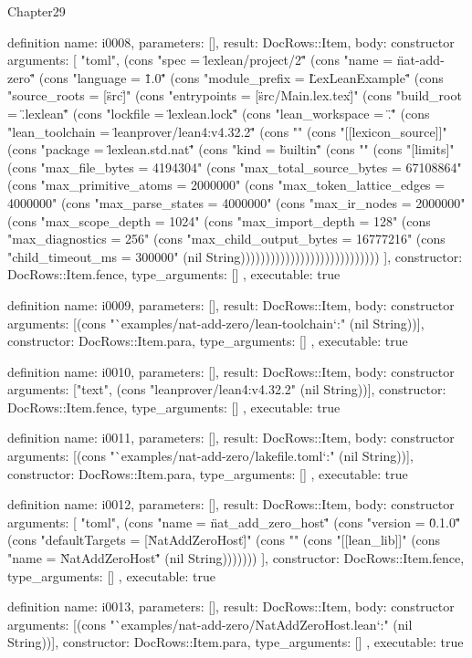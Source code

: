 \begin{lexlean}{Chapter29}
\begin{semanticmodule}
definition{
  name: i0008,
  parameters: [],
  result: DocRows::Item,
  body: constructor{
    arguments: [
      "toml",
      (cons "spec = \"lexlean/project/2\"" (cons "name = \"nat-add-zero\"" (cons "language = \"1.0\"" (cons "module_prefix = \"LexLeanExample\"" (cons "source_roots = [\"src\"]" (cons "entrypoints = [\"src/Main.lex.tex\"]" (cons "build_root = \".lexlean\"" (cons "lockfile = \"lexlean.lock\"" (cons "lean_workspace = \".\"" (cons "lean_toolchain = \"leanprover/lean4:v4.32.2\"" (cons "" (cons "[[lexicon_source]]" (cons "package = \"lexlean.std.nat\"" (cons "kind = \"builtin\"" (cons "" (cons "[limits]" (cons "max_file_bytes = 4194304" (cons "max_total_source_bytes = 67108864" (cons "max_primitive_atoms = 2000000" (cons "max_token_lattice_edges = 4000000" (cons "max_parse_states = 4000000" (cons "max_ir_nodes = 2000000" (cons "max_scope_depth = 1024" (cons "max_import_depth = 128" (cons "max_diagnostics = 256" (cons "max_child_output_bytes = 16777216" (cons "child_timeout_ms = 300000" (nil String))))))))))))))))))))))))))))
    ],
    constructor: DocRows::Item.fence,
    type_arguments: []
  },
  executable: true
}

definition{
  name: i0009,
  parameters: [],
  result: DocRows::Item,
  body: constructor{
    arguments: [(cons "`examples/nat-add-zero/lean-toolchain`:" (nil String))],
    constructor: DocRows::Item.para,
    type_arguments: []
  },
  executable: true
}

definition{
  name: i0010,
  parameters: [],
  result: DocRows::Item,
  body: constructor{
    arguments: ["text", (cons "leanprover/lean4:v4.32.2" (nil String))],
    constructor: DocRows::Item.fence,
    type_arguments: []
  },
  executable: true
}

definition{
  name: i0011,
  parameters: [],
  result: DocRows::Item,
  body: constructor{
    arguments: [(cons "`examples/nat-add-zero/lakefile.toml`:" (nil String))],
    constructor: DocRows::Item.para,
    type_arguments: []
  },
  executable: true
}

definition{
  name: i0012,
  parameters: [],
  result: DocRows::Item,
  body: constructor{
    arguments: [
      "toml",
      (cons "name = \"nat_add_zero_host\"" (cons "version = \"0.1.0\"" (cons "defaultTargets = [\"NatAddZeroHost\"]" (cons "" (cons "[[lean_lib]]" (cons "name = \"NatAddZeroHost\"" (nil String)))))))
    ],
    constructor: DocRows::Item.fence,
    type_arguments: []
  },
  executable: true
}

definition{
  name: i0013,
  parameters: [],
  result: DocRows::Item,
  body: constructor{
    arguments: [(cons "`examples/nat-add-zero/NatAddZeroHost.lean`:" (nil String))],
    constructor: DocRows::Item.para,
    type_arguments: []
  },
  executable: true
}


\end{semanticmodule}
\end{lexlean}
